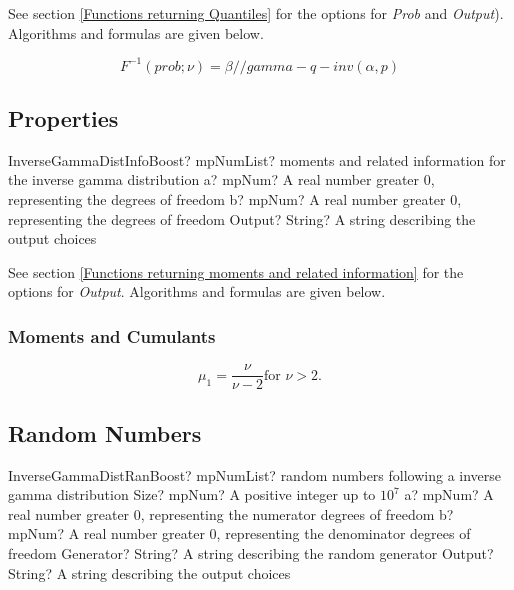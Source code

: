 See section \ref{Functions returning Quantiles} for the options for  {\itshape\sffamily Prob} and {\itshape\sffamily Output}). Algorithms and formulas are given below.

\begin{equation} 
	F^{-1}(prob;\nu)= \beta / / gamma-q-inv(\alpha, p)
\end{equation}


\subsection{Properties}
\label{InverseGammaDistributionProperties}


\begin{mpFunctionsExtract}
	\mpFunctionThreeNotImplemented
	{InverseGammaDistInfoBoost? mpNumList? moments and related information for the inverse gamma distribution}
	{a? mpNum? A real number greater 0, representing the degrees of freedom}
	{b? mpNum? A real number greater 0, representing the degrees of freedom}
	{Output? String? A string describing the output choices}
\end{mpFunctionsExtract}

\vspace{0.3cm}

See section \ref{Functions returning moments and related information} for the options for {\itshape\sffamily Output}. Algorithms and formulas are given below.

\subsubsection{Moments and Cumulants}
\begin{equation} 
	\mu_1 = \frac{\nu}{\nu-2} \text{for } \nu>2.
\end{equation}




\subsection{Random Numbers}

\begin{mpFunctionsExtract}
	\mpFunctionFiveNotImplemented
	{InverseGammaDistRanBoost? mpNumList? random numbers following a inverse gamma distribution}
	{Size? mpNum? A positive integer up to $10^7$}
	{a? mpNum? A real number greater 0, representing the numerator  degrees of freedom}
	{b? mpNum? A real number greater 0, representing the denominator degrees of freedom}
	{Generator? String? A string describing the random generator}
	{Output? String? A string describing the output choices}
\end{mpFunctionsExtract}

